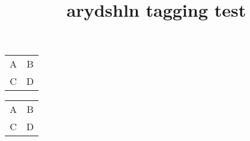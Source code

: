 \documentclass{article}
\title{arydshln tagging test}
\begin{document}
\begin{tabular}{c:c}
A & B \\
C & D
\end{tabular}

\begin{tabular}{cc}
A & B \\ \hdashline
C & D
\end{tabular}
\end{document}

